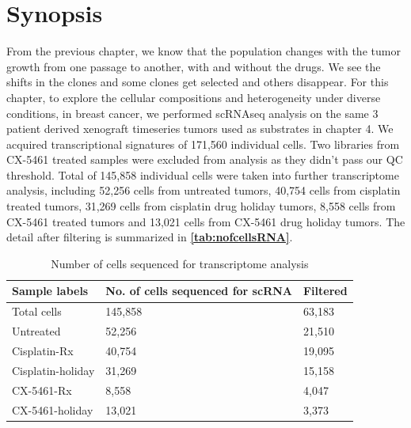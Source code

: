 \section{Synopsis}
 From the previous chapter, we know that the population changes with the tumor growth from one passage to another, with and without the drugs. We see the shifts in the clones and some clones get selected and others disappear.
For this chapter, to explore the cellular compositions and heterogeneity under diverse conditions, in breast cancer, we performed scRNAseq analysis on the same 3 patient derived xenograft timeseries tumors used as substrates in chapter 4. We acquired transcriptional signatures of 171,560 individual cells. Two libraries from CX-5461 treated samples were excluded from analysis as they didn't pass our QC threshold. Total of 145,858 individual cells were taken into further transcriptome analysis, including  52,256 cells from untreated tumors, 40,754 cells from cisplatin treated tumors, 31,269 cells from cisplatin drug holiday tumors, 8,558 cells from CX-5461 treated tumors and 13,021 cells from CX-5461 drug holiday tumors. The detail after filtering is summarized in  \textbf{\autoref{tab:nofcellsRNA}}.

\begin{table}[htbp]
 \centering
  \caption{Number of cells sequenced for transcriptome analysis}
{
\begin{tabular}{|l|l|l|}
\hline
Sample labels     & No. of cells sequenced for scRNA & Filtered \\
\hline
Total cells          & 145,858                          & 63,183\\
Untreated         & 52,256                           & 21,510    \\
Cisplatin-Rx      & 40,754                           & 19,095    \\
Cisplatin-holiday & 31,269                           & 15,158    \\
CX-5461-Rx        & 8,558                            & 4,047     \\
CX-5461-holiday   & 13,021                           & 3,373  \\  
\hline
\end{tabular}%
\label{tab:nofcellsRNA}
}
\end{table}

